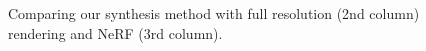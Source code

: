 \begin{figure}[htb]
\begin{minipage}{0.32\linewidth}
        
    \end{minipage}    
    
    \caption{Comparing our synthesis method with full resolution (2nd column) rendering and NeRF (3rd column).}
    {}
    \label{fig:results:comparison}
\end{figure}


